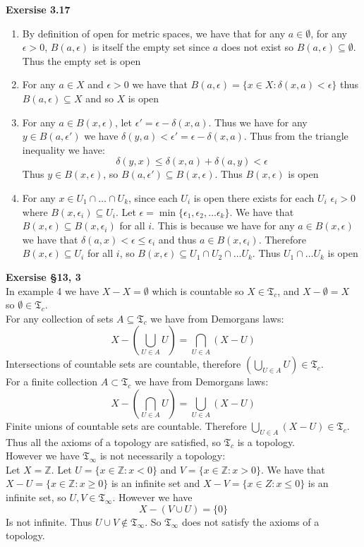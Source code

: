 \documentclass[12pt]{article}
\newenvironment{ques}[1]{\textbf{Exersise #1}\vspace{1 mm}\\ }{\bigskip}
\theoremstyle{definition}
\renewcommand{\l}{\left }
\renewcommand{\r}{\right }
\newcommand{\Z}{\mathbb Z}
\newcommand{\T}{\mathfrak{T}}
\begin{document}
\begin{ques}{3.17}
	\begin{enumerate}
		\item
			By definition of open for metric spaces, we have that
			for any $a \in \emptyset$, for any $\epsilon > 0$,
			$B(a, \epsilon)$ is itself the empty set since $a$ does
			not exist so $B(a, \epsilon ) \subseteq \emptyset$.
			Thus the empty set is open
		\item
			For any $a \in X$ and $\epsilon > 0$ we have that $B(a,
			\epsilon) = \{x \in X: \delta(x,a) < \epsilon\}$ thus
			$B(a,\epsilon) \subseteq X$ and so $X$ is open
		\item
			For any $a \in B(x, \epsilon)$, let $ \epsilon' =
			\epsilon - \delta(x, a)$. Thus we have for any $y \in
			B(a, \epsilon')$ we have $\delta(y,a) < \epsilon' =
			\epsilon - \delta(x,a)$. Thus from the triangle
			inequality we have:
			$$\delta(y,x) \leq \delta(x,a) + \delta(a,y) < \epsilon$$
			Thus $y \in B(x, \epsilon)$, so $B(a, \epsilon')
			\subseteq B(x, \epsilon)$. Thus $B(x, \epsilon)$ is open
		\item
			For any $x \in U_1 \cap \dots \cap U_k$, since each
			$U_i$ is open there exists for each $U_i$ $\epsilon_i >
			0$ where $B(x, \epsilon_i) \subseteq U_i$. Let
			$\epsilon = \min \{\epsilon_1, \epsilon_2, \dots
			\epsilon_k \}$. We have that $B(x, \epsilon) \subseteq
			B(x, \epsilon_i)$ for all $i$. This is because we have
			for any $a \in B(x, \epsilon)$ we have that
			$\delta(a,x) < \epsilon \leq \epsilon_i$ and thus $a
			\in B(x, \epsilon_i)$. Therefore $B(x, \epsilon)
			\subseteq U_i$ for all $i$, so $B(x, \epsilon)
			\subseteq U_1 \cap U_2 \cap \dots U_k$. Thus $U_1 \cap
			\dots U_k$ is open
	\end{enumerate}
\end{ques}

\begin{ques}{\S 13, 3}
	In example 4 we have $X - X = \emptyset$ which is countable so $X \in
	\T_c$, and $X - \emptyset = X$ so $\emptyset \in \T_c$.\\
	For any collection of sets $A \subseteq \T_c$ we have from Demorgans laws:
	$$X - \l(\bigcup_{U \in A}U \r) = \bigcap_{U \in A} (X - U)$$
	Intersections of countable sets are countable, therefore $\l(\bigcup_{U
	\in A}U \r) \in \T_c$.\\
	For a finite collection $A \subset \T_c$ we have from Demorgans laws:
	$$X - \l(\bigcap_{U \in A}U \r) = \bigcup_{U \in A} (X - U)$$
	Finite unions of countable sets are countable. Therefore $\bigcup_{U
	\in A} (X - U) \in \T_c$. Thus all the axioms of a topology are
	satisfied, so $\T_c$ is a topology.\\
	However we have $\T_\infty$ is not necessarily a topology:\\
	Let $X = \Z$. Let $U = \{x \in \Z: x < 0\}$ and $V = \{x \in \Z: x >
	0\}$. We have that $X - U = \{x \in \Z: x \geq 0\}$ is an infinite set
	and $X-V = \{x \in Z: x \leq 0\}$ is an infinite set, so $U,V \in
	\T_\infty$. However we have
	$$X - \l(V \cup U\r) = \{0\}$$
	Is not infinite. Thus $U \cup V \notin \T_\infty$. So $\T_\infty$ does
	not satisfy the axioms of a topology.
	
\end{ques}
\end{document}
